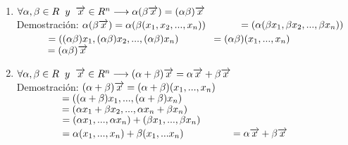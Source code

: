 \documentclass{book}
\begin{document}
\begin{enumerate}
    \item 
    $\forall \alpha ,\beta \in R\hspace*{0.2cm} y \hspace*{0.2cm} \overrightarrow{x}\in R^n \longrightarrow \alpha(\beta \overrightarrow{x})=(\alpha \beta)\overrightarrow{x}$
    \\Demostración:
    $\\\alpha(\beta\overrightarrow{x})=\alpha(\beta(x_{1},x_{2},...,x_{n}))$
    $\\\hspace*{1cm}=(\alpha(\beta x_{1},\beta x_{2},...,\beta x_{n}))$
    $\\\hspace*{1cm}=((\alpha \beta)x_{1},(\alpha\beta)x_{2},...,(\alpha\beta)x_{n})$
    $\\\hspace*{1cm}=(\alpha\beta)(x_{1},...,x_{n})$
    $\\\hspace*{1cm}=(\alpha\beta)\overrightarrow{x}$

    \item 
    $\forall \alpha ,\beta \in R\hspace*{0.2cm} y \hspace*{0.2cm} \overrightarrow{x}\in R^n \longrightarrow (\alpha+\beta)\overrightarrow{x}=\alpha \overrightarrow{x}+\beta\overrightarrow{x}$
    \\Demostración:
    $\\(\alpha+\beta)\overrightarrow{x}=(\alpha+\beta)(x_{1},...,x_{n})$
    $\\\hspace*{1.5cm}=((\alpha+\beta)x_{1},...,(\alpha+\beta)x_{n})$
    $\\\hspace*{1.5cm}=(\alpha x_{1}+\beta x_{2},...,\alpha x_{n}+\beta x_{n})$
    $\\\hspace*{1.5cm}=(\alpha x_{1},...,\alpha x_{n})+(\beta x_{1},...,\beta x_{n})$
    $\\\hspace*{1.5cm}=\alpha(x_{1},...,x_{n})+\beta(x_{1},...x_{n})$
    $\\\hspace*{1.5cm}=\alpha\overrightarrow{x}+\beta\overrightarrow{x}$



\end{enumerate}
\end{document}
